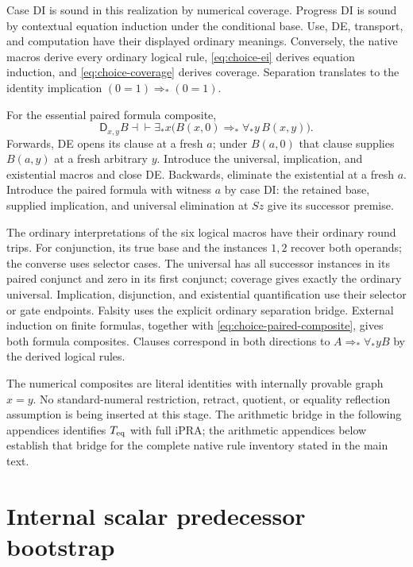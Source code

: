 \documentclass[11pt]{article}
\theoremstyle{definition}\newtheorem{definition}[theorem]{Definition}
\begin{document}
Case DI is sound in this realization by numerical coverage.
Progress DI is sound by contextual equation induction under
the conditional base. Use, DE, transport, and computation
have their displayed ordinary meanings. Conversely, the
native macros derive every ordinary logical rule,
\eqref{eq:choice-ei} derives equation induction, and
\eqref{eq:choice-coverage} derives coverage. Separation
translates to the identity implication
$(0=1)\Rightarrow_*(0=1)$.

For the essential paired formula composite,
\[
 \mathsf D_{x,y}B
 \dashv\vdash
 \exists_*x\bigl(B(x,0)\Rightarrow_*\forall_*y\,B(x,y)\bigr).
\tag{Paired composite}\label{eq:choice-paired-composite}
\]
Forwards, DE opens its clause at a fresh $a$; under $B(a,0)$
that clause supplies $B(a,y)$ at a fresh arbitrary $y$.
Introduce the universal, implication, and existential
macros and close DE. Backwards, eliminate the existential
at a fresh $a$. Introduce the paired formula with witness
$a$ by case DI: the retained base, supplied implication,
and universal elimination at $Sz$ give its successor premise.

The ordinary interpretations of the six logical macros
have their ordinary round trips. For conjunction, its true
base and the instances $1,2$ recover both operands;
the converse uses selector cases. The universal has all
successor instances in its paired conjunct and zero in
its first conjunct; coverage gives exactly the ordinary
universal. Implication, disjunction, and existential
quantification use their selector or gate endpoints.
Falsity uses the explicit ordinary separation bridge.
External induction on finite formulas, together with
\eqref{eq:choice-paired-composite}, gives both formula
composites. Clauses correspond in both directions to
$A\Rightarrow_*\forall_*yB$ by the derived logical rules.

The numerical composites are literal identities with
internally provable graph $x=y$. No standard-numeral
restriction, retract, quotient, or equality reflection
assumption is being inserted at this stage. The arithmetic bridge in the following appendices identifies $T_{\rm eq}$ with
full iPRA; the arithmetic appendices below establish that bridge for the complete native rule inventory stated in the main text.


\section{Internal scalar predecessor bootstrap}
\label{sec:hybrid-bootstrap}
\end{document}
